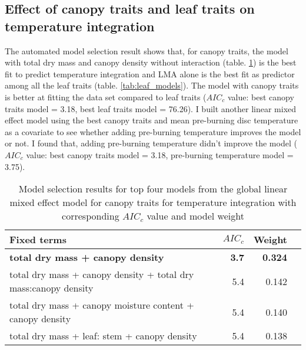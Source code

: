 \documentclass[12pt]{report}
\begin{document}

\subsection{Effect of canopy traits and leaf traits on temperature integration}

The automated model selection result shows that, for canopy traits, the model with total dry mass and canopy density without interaction (table. \ref{tab:canopy_models}) is the best fit to predict temperature integration and \MakeUppercase{lma} alone is the best fit as predictor among all the leaf traits (table. \ref{tab:leaf_models}). The model with canopy traits is better at fitting the data set compared to leaf traits ($AIC_{c}$ value: best canopy traits model = 3.18, best leaf traits model = 76.26). I built another linear mixed effect model using the best canopy traits and mean pre-burning disc temperature as a covariate to see whether adding pre-burning temperature improves the model or not. I found that, adding pre-burning temperature didn't improve the model ($AIC_{c}$ value: best canopy traits model = 3.18, pre-burning temperature model = 3.75).

\begin{table}
  \centering
  \caption{Model selection results for top four models from the global linear
    mixed effect model for canopy traits for temperature integration with
    corresponding $AIC_{c}$ value and model weight}
  \vspace{0.5 cm}
  \begin{tabular}{lrrr}
    \toprule
    \textbf{Fixed terms} & $AIC_{c}$ & \textbf{Weight}\\
    \midrule
    \textbf{total dry mass + canopy density}    & \textbf{3.7} &  \textbf{0.324}\\
    total dry mass + canopy density + total dry mass:canopy density & 5.4  & 0.142 \\
    total dry mass + canopy moisture content + canopy density   & 5.4   & 0.140 \\ 
    total dry mass + leaf: stem + canopy density  & 5.4 & 0.138  \\
    \bottomrule
  \end{tabular}
  \label{tab:canopy_models}
\end{table}
\end{document}
